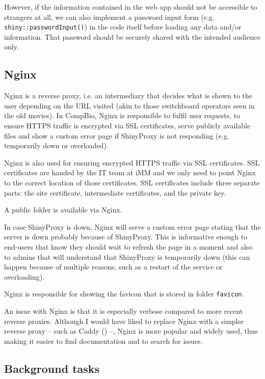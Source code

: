 However, if the information contained in the web app should not be accessible to strangers at all, we can also implement a password input form (e.g. \texttt{shiny::passwordInput()}) in the code itself before loading any data and/or information. That password should be securely shared with the intended audience only.

\subsection{Nginx}

Nginx is a reverse proxy, i.e. an intermediary that decides what is shown to the user depending on the URL visited (akin to those switchboard operators seen in the old movies). In CompBio, Nginx is responsible to fulfil user requests, to ensure HTTPS traffic is encrypted via SSL certificates, serve publicly available files and show a custom error page if ShinyProxy is not responding (e.g. temporarily down or overloaded).

Nginx is also used for ensuring encrypted HTTPS traffic via SSL certificates. SSL certificates are handed by the IT team at iMM and we only need to point Nginx to the correct location of those certificates. SSL certificates include three separate parts: the site certificate, intermediate certificates, and the private key.

A public folder is available via Nginx.

In case ShinyProxy is down, Nginx will serve a custom error page stating that the server is down probably because of ShinyProxy. This is informative enough to end-users that know they should wait to refresh the page in a moment and also to admins that will understand that ShinyProxy is temporarily down (this can happen because of multiple reasons, such as a restart of the service or overloading).

Nginx is responsible for showing the favicon that is stored in folder \texttt{favicon}.

An issue with Nginx is that it is especially verbose compared to more recent reverse proxies. Although I would have liked to replace Nginx with a simpler reverse proxy -- such as Caddy () --, Nginx is more popular and widely used, thus making it easier to find documentation and to search for issues.

\subsection{Background tasks}

